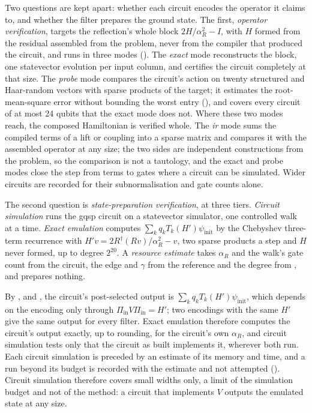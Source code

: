 Two questions are kept apart: whether each circuit encodes the operator it claims to, and whether the filter prepares the ground state. The first, \emph{operator verification}, targets the reflection's whole block $2H/\alpha_R^2-I$, with $H$ formed from the residual assembled from the problem, never from the compiler that produced the circuit, and runs in three modes (). The \emph{exact} mode reconstructs the block, one statevector evolution per input column, and certifies the circuit completely at that size. The \emph{probe} mode compares the circuit's action on twenty structured and Haar-random vectors with sparse products of the target; it estimates the root-mean-square error without bounding the worst entry (), and covers every circuit of at most 24 qubits that the exact mode does not. Where these two modes reach, the composed Hamiltonian is verified whole. The \emph{\gls{ir}} mode sums the compiled terms of a lift or coupling into a sparse matrix and compares it with the assembled operator at any size; the two sides are independent constructions from the problem, so the comparison is not a tautology, and the exact and probe modes close the step from terms to gates where a circuit can be simulated. Wider circuits are recorded for their subnormalisation and gate counts alone.

The second question is \emph{state-preparation verification}, at three tiers. \emph{Circuit simulation} runs the \gls{gqsp} circuit on a statevector simulator, one controlled walk at a time. \emph{Exact emulation} computes $\sum_kq_kT_k(H')\psi_{\mathrm{init}}$ by the Chebyshev three-term recurrence with $H'v=2R^\dagger(Rv)/\alpha_R^2-v$, two sparse products a step and $H$ never formed, up to degree $2^{20}$. A \emph{resource estimate} takes $\alpha_R$ and the walk's gate count from the circuit, the edge and $\gamma$ from the reference and the degree from , and prepares nothing.

By ,  and , the circuit's post-selected output is $\sum_kq_kT_k(H')\psi_{\mathrm{init}}$, which depends on the encoding only through $\Pi_{\mathrm{in}}V\Pi_{\mathrm{in}}=H'$; two encodings with the same $H'$ give the same output for every filter. Exact emulation therefore computes the circuit's output exactly, up to rounding, for the circuit's own $\alpha_R$, and circuit simulation tests only that the circuit as built implements it, wherever both run. Each circuit simulation is preceded by an estimate of its memory and time, and a run beyond its budget is recorded with the estimate and not attempted (). Circuit simulation therefore covers small widths only, a limit of the simulation budget and not of the method: a circuit that implements $V$ outputs the emulated state at any size.

